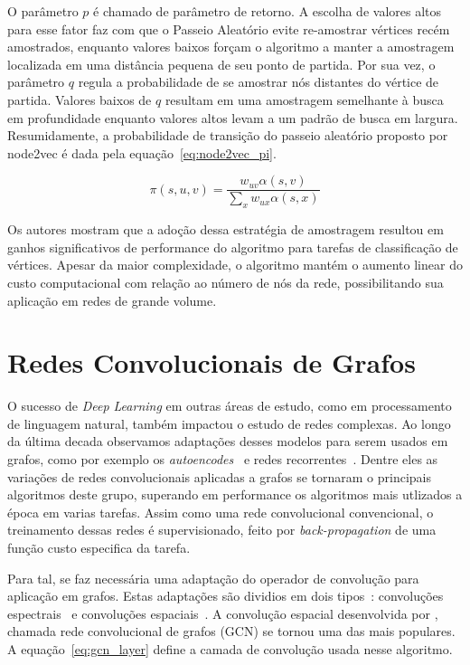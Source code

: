 O parâmetro $p$ é chamado de parâmetro de retorno.
A escolha de valores altos para esse fator faz com que o Passeio Aleatório evite
re-amostrar vértices recém amostrados, enquanto valores baixos forçam o
algoritmo a manter a amostragem localizada em uma distância pequena de seu ponto
de partida.
Por sua vez, o parâmetro $q$ regula a probabilidade de se amostrar nós distantes
do vértice de partida.
Valores baixos de $q$ resultam em uma amostragem semelhante à busca em
profundidade enquanto valores altos levam a um padrão de busca em largura.
Resumidamente, a probabilidade de transição do passeio aleatório proposto por
node2vec é dada pela equação~\ref{eq:node2vec_pi}.

\begin{equation} \label{eq:node2vec_pi}
    \pi(s, u, v) = \frac{w_{uv} \alpha(s,v)}{\sum_{x} w_{ux} \alpha(s,x)}
\end{equation}

Os autores mostram que a adoção dessa estratégia de amostragem resultou em
ganhos significativos de performance do algoritmo para tarefas de classificação
de vértices.
Apesar da maior complexidade, o algoritmo mantém o aumento linear do custo
computacional com relação ao número de nós da rede, possibilitando sua aplicação
em redes de grande volume.

\section{Redes Convolucionais de Grafos}

O sucesso de \textit{Deep Learning} em outras áreas de estudo, como em
processamento de linguagem natural, também impactou o estudo de redes complexas.
Ao longo da última decada observamos adaptações desses modelos para serem usados
em grafos, como por exemplo os \textit{autoencodes}~\cite{wang16}\cite{cao16}
e redes recorrentes~\cite{scarselli08}\cite{you18}.
Dentre eles as variações de redes convolucionais aplicadas a grafos se tornaram
o principais algoritmos deste grupo, superando em performance os algoritmos mais
utlizados a época em varias tarefas.
Assim como uma rede convolucional convencional, o treinamento dessas redes é
supervisionado, feito por \textit{back-propagation} de uma função custo especifica
da tarefa.

Para tal, se faz necessária uma adaptação do operador de convolução para aplicação
em grafos. Estas adaptações são dividios em dois tipos~\cite{zhang20}: convoluções
espectrais~\cite{bruna13}\cite{defferrard16} e convoluções espaciais~\cite{kipf16}.
A convolução espacial desenvolvida por \citet{kipf16}, chamada rede
convolucional de grafos (GCN) se tornou uma das mais populares.
A equação~\ref{eq:gcn_layer} define a camada de convolução usada nesse
algoritmo.


